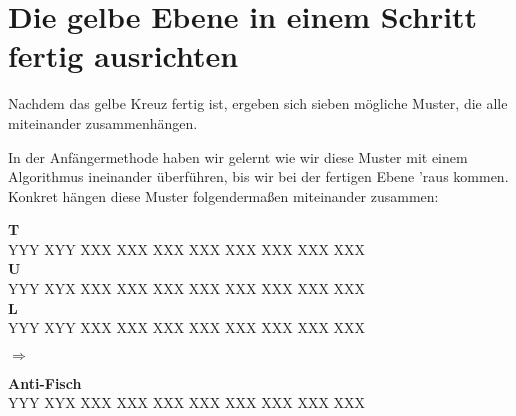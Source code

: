 \section{Die gelbe Ebene in einem Schritt fertig ausrichten}
Nachdem das gelbe Kreuz fertig ist, ergeben sich sieben mögliche Muster, die alle miteinander zusammenhängen.

In der Anfängermethode haben wir gelernt wie wir diese Muster mit einem Algorithmus ineinander überführen, bis wir bei der fertigen Ebene 'raus kommen.
Konkret hängen diese Muster folgendermaßen miteinander zusammen:\\[1em]
\parbox{0.2\linewidth}{
  \centering
  \textbf{T} \\[1ex]
  \RubikCubeGreyAll%
	      {Y}{Y}{Y}
	      {X}{Y}{Y}%
		 {X}{X}{X}
		 {X}{X}{X}%
		 {X}{X}{X}
		 {X}{X}{X}%
		{X}{X}{X}
		{X}{X}{X}%
		{X}{X}{X}
		{X}{X}{X}%
  \\[1em]
  \textbf{U} \\[1ex]
  \RubikCubeGreyAll%
	      {Y}{Y}{Y}
	      {X}{Y}{X}%
		 {X}{X}{X}
		 {X}{X}{X}%
		 {X}{X}{X}
		 {X}{X}{X}%
		{X}{X}{X}
		{X}{X}{X}%
		{X}{X}{X}
		{X}{X}{X}%
  \\[1em]
  \textbf{L} \\[1ex]
  \RubikCubeGreyAll%
	      {Y}{Y}{Y}
	      {X}{Y}{Y}%
		 {X}{X}{X}
		 {X}{X}{X}%
		 {X}{X}{X}
		 {X}{X}{X}%
		{X}{X}{X}
		{X}{X}{X}%
		{X}{X}{X}
		{X}{X}{X}%
}
$\Longrightarrow$
\parbox{0.2\linewidth}{
\begin{center}
  \textbf{Anti-Fisch} \\[1ex]
  \RubikCubeGreyAll%
	      {Y}{Y}{Y}
	      {X}{Y}{X}%
		 {X}{X}{X}
		 {X}{X}{X}%
		 {X}{X}{X}
		 {X}{X}{X}%
		{X}{X}{X}
		{X}{X}{X}%
		{X}{X}{X}
		{X}{X}{X}%
\end{center}
}
